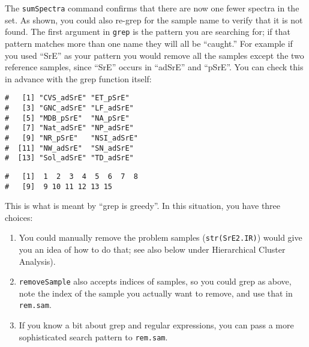 \documentclass[letter,10pt,twocolumn,twoside,printwatermark=false]{pinp}
\begin{document}
The \texttt{sumSpectra} command confirms that there are now one fewer
spectra in the set. As shown, you could also re-grep for the sample name
to verify that it is not found. The first argument in \texttt{grep} is
the pattern you are searching for; if that pattern matches more than one
name they will all be ``caught.'' For example if you used ``SrE'' as
your pattern you would remove all the samples except the two reference
samples, since ``SrE'' occurs in ``adSrE'' and ``pSrE''. You can check
this in advance with the grep function itself:

\begin{Shaded}
\begin{Highlighting}[]
\StringTok{ }\NormalTok{(}\OperatorTok{$}
\OperatorTok{$}
\end{Highlighting}
\end{Shaded}

\begin{ShadedResult}
\begin{verbatim}
#   [1] "CVS_adSrE" "ET_pSrE"  
#   [3] "GNC_adSrE" "LF_adSrE" 
#   [5] "MDB_pSrE"  "NA_pSrE"  
#   [7] "Nat_adSrE" "NP_adSrE" 
#   [9] "NR_pSrE"   "NSI_adSrE"
#  [11] "NW_adSrE"  "SN_adSrE" 
#  [13] "Sol_adSrE" "TD_adSrE"
\end{verbatim}
\end{ShadedResult}

\begin{Shaded}
\begin{Highlighting}[]
\end{Highlighting}
\end{Shaded}

\begin{ShadedResult}
\begin{verbatim}
#   [1]  1  2  3  4  5  6  7  8
#   [9]  9 10 11 12 13 15
\end{verbatim}
\end{ShadedResult}

This is what is meant by ``grep is greedy''. In this situation, you have
three choices:

\begin{enumerate}
  \item You could manually remove the problem samples (\texttt{str(SrE2.IR)}) would give you an idea of how to do that; see also below under Hierarchical Cluster Analysis).
  \item \texttt{removeSample} also accepts indices of samples, so you could grep as above, note the index of the sample you actually want to remove, and use that in \texttt{rem.sam}.
  \item If you know a bit about grep and regular expressions, you can pass a more sophisticated search pattern to \texttt{rem.sam}.
\end{enumerate}
\end{document}
